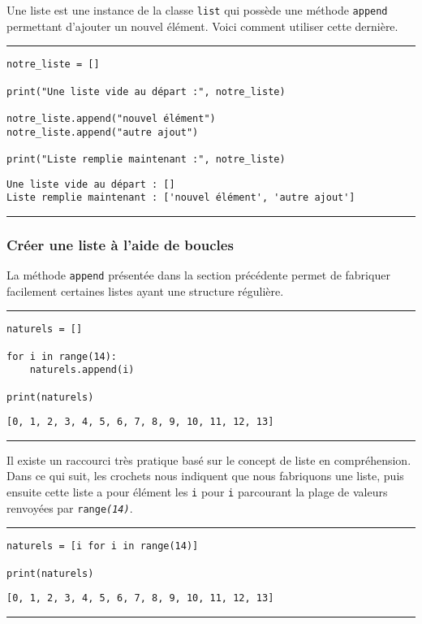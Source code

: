 Une liste est une instance de la classe \texttt{list} qui possède une méthode \texttt{append} permettant d'ajouter un nouvel élément. Voici comment utiliser cette dernière.


\bigskip
{\hrule height .5mm}
\begin{verbatim}
notre_liste = []

print("Une liste vide au départ :", notre_liste)

notre_liste.append("nouvel élément")
notre_liste.append("autre ajout")

print("Liste remplie maintenant :", notre_liste)
\end{verbatim}
 \color{ForestGreen}
\vspace{-1.5em}
\begin{verbatim}
Une liste vide au départ : []
Liste remplie maintenant : ['nouvel élément', 'autre ajout']
\end{verbatim} \color{Black}
{\hrule height .5mm}
\bigskip


\subsubsection{Créer une liste à l'aide de boucles}

La méthode \texttt{append} présentée dans la section précédente permet de fabriquer facilement certaines listes ayant une structure régulière.


\bigskip
{\hrule height .5mm}
\begin{verbatim}
naturels = []

for i in range(14):
    naturels.append(i)

print(naturels)
\end{verbatim}
 \color{ForestGreen}
\vspace{-1.5em}
\begin{verbatim}
[0, 1, 2, 3, 4, 5, 6, 7, 8, 9, 10, 11, 12, 13]
\end{verbatim} \color{Black}
{\hrule height .5mm}
\bigskip


Il existe un raccourci très pratique basé sur le concept de liste en compréhension. Dans ce qui suit, les crochets nous indiquent que nous fabriquons une liste, puis ensuite cette liste a pour élément les \texttt{i} pour \texttt{i} parcourant la plage de valeurs renvoyées par \texttt{range\textit{(14)}}.

\newpage

\bigskip
{\hrule height .5mm}
\begin{verbatim}
naturels = [i for i in range(14)]

print(naturels)
\end{verbatim}
 \color{ForestGreen}
\vspace{-1.5em}
\begin{verbatim}
[0, 1, 2, 3, 4, 5, 6, 7, 8, 9, 10, 11, 12, 13]
\end{verbatim} \color{Black}
{\hrule height .5mm}
\bigskip


